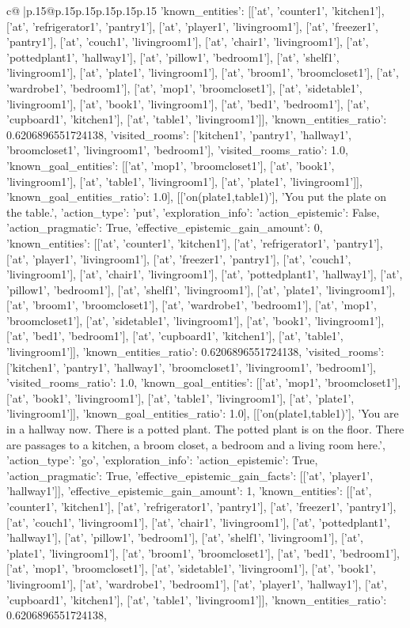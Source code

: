 \documentclass{article}
\begin{document}
{\begin{supertabular}{c@{$\;$}|p{.15\linewidth}@{}p{.15\linewidth}p{.15\linewidth}p{.15\linewidth}p{.15\linewidth}p{.15\linewidth}}
{{{'known_entities': [['at', 'counter1', 'kitchen1'], ['at', 'refrigerator1', 'pantry1'], ['at', 'player1', 'livingroom1'], ['at', 'freezer1', 'pantry1'], ['at', 'couch1', 'livingroom1'], ['at', 'chair1', 'livingroom1'], ['at', 'pottedplant1', 'hallway1'], ['at', 'pillow1', 'bedroom1'], ['at', 'shelf1', 'livingroom1'], ['at', 'plate1', 'livingroom1'], ['at', 'broom1', 'broomcloset1'], ['at', 'wardrobe1', 'bedroom1'], ['at', 'mop1', 'broomcloset1'], ['at', 'sidetable1', 'livingroom1'], ['at', 'book1', 'livingroom1'], ['at', 'bed1', 'bedroom1'], ['at', 'cupboard1', 'kitchen1'], ['at', 'table1', 'livingroom1']], 'known_entities_ratio': 0.6206896551724138, 'visited_rooms': ['kitchen1', 'pantry1', 'hallway1', 'broomcloset1', 'livingroom1', 'bedroom1'], 'visited_rooms_ratio': 1.0, 'known_goal_entities': [['at', 'mop1', 'broomcloset1'], ['at', 'book1', 'livingroom1'], ['at', 'table1', 'livingroom1'], ['at', 'plate1', 'livingroom1']], 'known_goal_entities_ratio': 1.0}}], [['on(plate1,table1)'], 'You put the plate on the table.', {'action_type': 'put', 'exploration_info': {'action_epistemic': False, 'action_pragmatic': True, 'effective_epistemic_gain_amount': 0, 'known_entities': [['at', 'counter1', 'kitchen1'], ['at', 'refrigerator1', 'pantry1'], ['at', 'player1', 'livingroom1'], ['at', 'freezer1', 'pantry1'], ['at', 'couch1', 'livingroom1'], ['at', 'chair1', 'livingroom1'], ['at', 'pottedplant1', 'hallway1'], ['at', 'pillow1', 'bedroom1'], ['at', 'shelf1', 'livingroom1'], ['at', 'plate1', 'livingroom1'], ['at', 'broom1', 'broomcloset1'], ['at', 'wardrobe1', 'bedroom1'], ['at', 'mop1', 'broomcloset1'], ['at', 'sidetable1', 'livingroom1'], ['at', 'book1', 'livingroom1'], ['at', 'bed1', 'bedroom1'], ['at', 'cupboard1', 'kitchen1'], ['at', 'table1', 'livingroom1']], 'known_entities_ratio': 0.6206896551724138, 'visited_rooms': ['kitchen1', 'pantry1', 'hallway1', 'broomcloset1', 'livingroom1', 'bedroom1'], 'visited_rooms_ratio': 1.0, 'known_goal_entities': [['at', 'mop1', 'broomcloset1'], ['at', 'book1', 'livingroom1'], ['at', 'table1', 'livingroom1'], ['at', 'plate1', 'livingroom1']], 'known_goal_entities_ratio': 1.0}}], [['on(plate1,table1)'], 'You are in a hallway now. There is a potted plant. The potted plant is on the floor. There are passages to a kitchen, a broom closet, a bedroom and a living room here.', {'action_type': 'go', 'exploration_info': {'action_epistemic': True, 'action_pragmatic': True, 'effective_epistemic_gain_facts': [['at', 'player1', 'hallway1']], 'effective_epistemic_gain_amount': 1, 'known_entities': [['at', 'counter1', 'kitchen1'], ['at', 'refrigerator1', 'pantry1'], ['at', 'freezer1', 'pantry1'], ['at', 'couch1', 'livingroom1'], ['at', 'chair1', 'livingroom1'], ['at', 'pottedplant1', 'hallway1'], ['at', 'pillow1', 'bedroom1'], ['at', 'shelf1', 'livingroom1'], ['at', 'plate1', 'livingroom1'], ['at', 'broom1', 'broomcloset1'], ['at', 'bed1', 'bedroom1'], ['at', 'mop1', 'broomcloset1'], ['at', 'sidetable1', 'livingroom1'], ['at', 'book1', 'livingroom1'], ['at', 'wardrobe1', 'bedroom1'], ['at', 'player1', 'hallway1'], ['at', 'cupboard1', 'kitchen1'], ['at', 'table1', 'livingroom1']], 'known_entities_ratio': 0.6206896551724138, }}}
\end{supertabular}}
\end{document}
